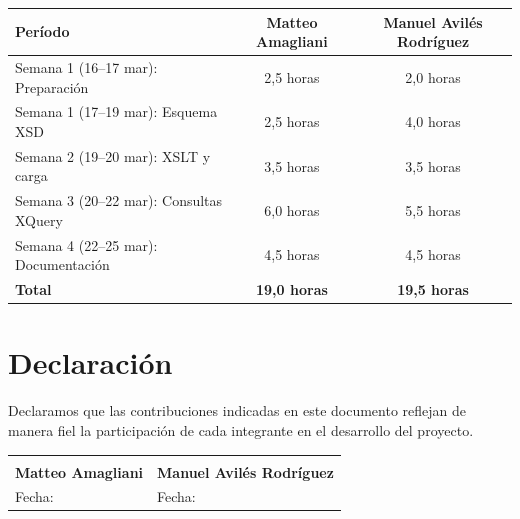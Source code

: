 \documentclass[11pt,a4paper]{article}
\begin{document}
\begin{table}[H]
\centering
\renewcommand{\arraystretch}{1.3}
\begin{tabularx}{\textwidth}{Xcc}
\toprule
\textbf{Per\'iodo} & \textbf{Matteo Amagliani} & \textbf{Manuel Avil\'es Rodr\'iguez} \\
\midrule
Semana 1 (16--17 mar): Preparaci\'on      & 2,5 horas  & 2,0 horas \\
Semana 1 (17--19 mar): Esquema XSD        & 2,5 horas  & 4,0 horas \\
Semana 2 (19--20 mar): XSLT y carga       & 3,5 horas  & 3,5 horas \\
Semana 3 (20--22 mar): Consultas XQuery   & 6,0 horas  & 5,5 horas \\
Semana 4 (22--25 mar): Documentaci\'on    & 4,5 horas  & 4,5 horas \\
\midrule
\textbf{Total} & \textbf{19,0 horas} & \textbf{19,5 horas} \\
\bottomrule
\end{tabularx}
\end{table}

\section*{Declaraci\'on}

Declaramos que las contribuciones indicadas en este documento reflejan de manera fiel la participaci\'on de cada integrante en el desarrollo del proyecto.

\vspace{2cm}

\noindent
\begin{tabularx}{\textwidth}{XX}
\hrulefill & \hrulefill \\
\textbf{Matteo Amagliani} & \textbf{Manuel Avil\'es Rodr\'iguez} \\
Fecha: \underline{\hspace{3cm}} & Fecha: \underline{\hspace{3cm}} \\
\end{tabularx}
\end{document}
